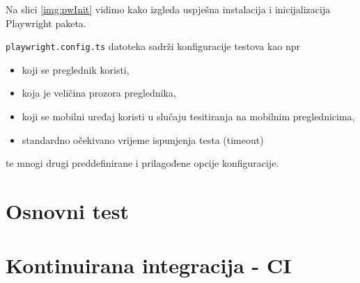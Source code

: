 Na slici \ref{img:pwInit} vidimo kako izgleda uspješna instalacija i inicijalizacija Playwright paketa.

\texttt{playwright.config.ts} datoteka sadrži konfiguracije testova kao npr 
\begin{itemize}
    \item koji se preglednik koristi, 
    \item koja je veličina prozora preglednika, 
    \item koji se mobilni uređaj koristi u slučaju tesitiranja na mobilnim preglednicima,
    \item standardno očekivano vrijeme ispunjenja testa (timeout)
\end{itemize}
te mnogi drugi preddefinirane i prilagođene opcije konfiguracije.


\section{Osnovni test}

\section{Kontinuirana integracija - CI}
